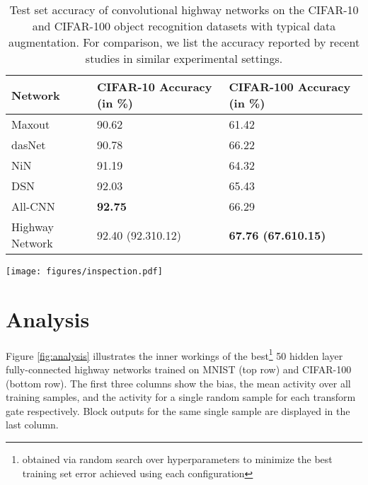 \documentclass{article}
\begin{document}
\begin{table}
\centering
    \begin{tabular}{lll}
       \hline
       \textbf{Network} & \textbf{CIFAR-10 Accuracy (in \%)} & \textbf{CIFAR-100 Accuracy (in \%)} \\ \hline
       Maxout \cite{Goodfellow2013}      & 90.62                 & 61.42\\ 
       dasNet \cite{Stollenga2014}       & 90.78                 & 66.22\\
       NiN \cite{Lin2014}                & 91.19                 & 64.32\\
       DSN \cite{Lee2015}                & 92.03                 & 65.43\\
       All-CNN \cite{Springenberg2014}   & \textbf{92.75}        & 66.29\\
       Highway Network                   & 92.40 (92.310.12) & \textbf{67.76 (67.610.15)}\\
       \hline
    \end{tabular}
    \caption{Test set accuracy of convolutional highway networks on the CIFAR-10 and CIFAR-100 object recognition datasets with typical data augmentation. For comparison, we list the accuracy reported by recent studies in similar experimental settings.}
        \label{tab:sota-cifar}
\end{table}


\begin{figure*}[t]
\texttt{[image: figures/inspection.pdf]}
\caption{Visualization of best 50 hidden-layer highway networks trained on MNIST (top row) and CIFAR-100 (bottom row). 
The first hidden layer is a plain layer which changes the dimensionality of the representation to 50. 
Each of the 49 highway layers (y-axis) consists of 50 blocks (x-axis).
The first column shows the transform gate biases, which were initialized to -2 and -4 respectively. 
In the second column the mean output of the transform gate over all training examples is depicted.
The third and fourth columns show the output of the transform gates and the block outputs (both networks using tanh) for a single random training sample. Best viewed in color.}
\label{fig:analysis}
\end{figure*}

\section{Analysis}
Figure \ref{fig:analysis} illustrates the inner workings of the best\footnote{obtained via random search over hyperparameters to minimize the best training set error achieved using each configuration} 50 hidden layer fully-connected highway networks trained on MNIST (top row) and CIFAR-100 (bottom row). The first three columns show the bias, the mean activity over all training samples, and the activity for a single random sample for each transform gate respectively. Block outputs for the same single sample are displayed in the last column.
\end{document}
